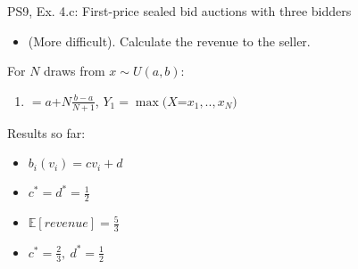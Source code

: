 \begin{frame}{PS9, Ex. 4.c: First-price sealed bid auctions with three bidders}
    \begin{itemize}
      \item[(c)] (More difficult). Calculate the revenue to the seller.
    \end{itemize}
    \vspace{-8pt}
    \begin{multicols}{2}
      \vfill\null\columnbreak
      For $N$ draws from $x\sim U(a, b):$
      \vspace{-6pt}
      \begin{enumerate}
        \item[$\mathbb{E}(Y_1)$] $=a$+$N\frac{b-a}{N+1}$, $Y_1=\max(X$=$x_1,..,x_N)$
      \end{enumerate}
      \vspace{-6pt}
      Results so far:
      \vspace{-6pt}
      \begin{itemize}
        \item[($*$)] $b_i(v_i) = cv_i+d$
        \item[(3.a)] $c^*=d^*=\frac{1}{2}$
        \item[(3.b)] $\mathbb{E}[revenue]=\frac{5}{3}$
        \item[(4.a)] $c^*=\frac{2}{3},\ d^*=\frac{1}{2}$
      \end{itemize}
      \vfill\null
    \end{multicols}
    \vfill\null
\end{frame}
